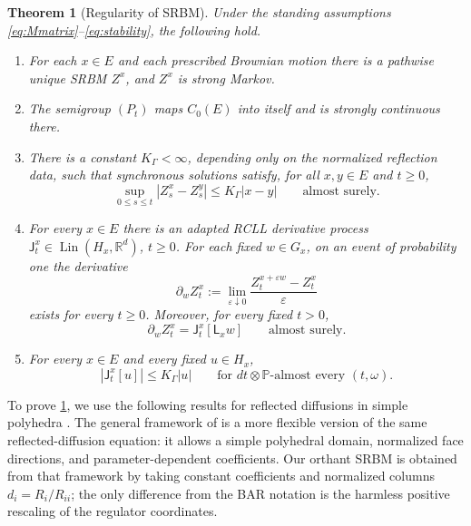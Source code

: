 \documentclass[aihp]{imsart}
\numberwithin{equation}{section}
\theoremstyle{plain}
\newtheorem{theorem}{Theorem}[section]
\theoremstyle{definition}
\newcommand{\R}{\mathbb R}
\newcommand{\1}{\mathbf 1}
\newcommand{\abs}[1]{\left\lvert #1\right\rvert}
\begin{document}
\begin{theorem}[Regularity of SRBM]\label{thm:regularity-SRBM}
Under the standing assumptions \eqref{eq:Mmatrix}--\eqref{eq:stability}, the
following hold.
\begin{enumerate}[label=\textup{(\roman*)}]
\item For each $x\in E$ and each prescribed Brownian motion there is a pathwise
unique SRBM $Z^x$, and $Z^x$ is strong Markov.

\item The semigroup $(P_t)$ maps $C_0(E)$ into itself and is strongly continuous
there.

\item There is a constant $K_\Gamma<\infty$, depending only on the normalized
reflection data, such that synchronous solutions satisfy, for all $x,y\in E$ and
$t\ge0$,
\begin{equation}\label{eq:pathwise-Lipschitz}
        \sup_{0\le s\le t}\abs{Z_s^x-Z_s^y}
        \le K_\Gamma\abs{x-y}
        \qquad\text{almost surely.}
\end{equation}

\item For every $x\in E$ there is an adapted RCLL derivative process
$\mathsf J_t^x\in\operatorname{Lin}(H_x,\R^d)$, $t\ge0$.  For each fixed
$w\in G_x$, on an event of probability one the derivative
\[
        \partial_w Z_t^x
        :=
        \lim_{\varepsilon\downarrow0}
        \frac{Z_t^{x+\varepsilon w}-Z_t^x}{\varepsilon}
\]
exists for every $t\ge0$.  Moreover, for every fixed $t>0$,
\begin{equation}\label{eq:fixed-time-derivative}
        \partial_w Z_t^x
        =
        \mathsf J_t^x[\mathsf L_xw]
        \qquad\text{almost surely.}
\end{equation}

\item For every $x\in E$ and every fixed $u\in H_x$,
\[
        \abs{\mathsf J_t^x[u]}
        \le
        K_\Gamma\abs{u}
        \qquad
        \text{for }dt\otimes\mathbb P\text{-almost every }(t,\omega).
\]
\end{enumerate}
\end{theorem}

To prove \cref{thm:regularity-SRBM}, we use the following results for reflected
diffusions in simple polyhedra \cite{LipshutzRamanan2019,LipshutzRamanan2021}.  The general framework of \cite{LipshutzRamanan2019,LipshutzRamanan2021} is a more flexible version
of the same reflected-diffusion equation: it allows a simple polyhedral domain,
normalized face directions, and parameter-dependent coefficients.  Our orthant
SRBM is obtained from that framework by taking constant coefficients and
normalized columns $d_i=R_i/R_{ii}$; the only difference from the BAR notation is
the harmless positive rescaling of the regulator coordinates.
\end{document}
